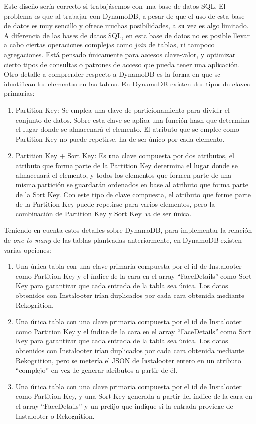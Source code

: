 Este diseño sería correcto si trabajásemos con una base de datos SQL. El problema es que al trabajar con DynamoDB, a pesar de que el uso de esta base de datos es muy sencillo y ofrece muchas posibilidades, a su vez es algo limitado. A diferencia de las bases de datos SQL, en esta base de datos no es posible llevar a cabo ciertas operaciones complejas como \textit{join} de tablas, ni tampoco agregaciones. Está pensado únicamente para accesos clave-valor, y optimizar cierto tipos de consultas o patrones de acceso que pueda tener una aplicación. Otro detalle a comprender respecto a DynamoDB es la forma en que se identifican los elementos en las tablas. En DynamoDB existen dos tipos de claves primarias:
\begin{enumerate}
    \item Partition Key: Se emplea una clave de particionamiento para dividir el conjunto de datos. Sobre esta clave se aplica una función hash que determina el lugar donde se almacenará el elemento. El atributo que se emplee como Partition Key no puede repetirse, ha de ser único por cada elemento.
    \item Partition Key + Sort Key: Es una clave compuesta por dos atributos, el atributo que forma parte de la Partition Key determina el lugar donde se almacenará el elemento, y todos los elementos que formen parte de una misma partición se guardarán ordenados en base al atributo que forma parte de la Sort Key. Con este tipo de clave compuesta, el atributo que forme parte de la Partition Key puede repetirse para varios elementos, pero la combinación de Partition Key y Sort Key ha de ser única.
\end{enumerate}

Teniendo en cuenta estos detalles sobre DynamoDB, para implementar la relación de \textit{one-to-many} de las tablas planteadas anteriormente, en DynamoDB existen varias opciones:
\begin{enumerate}
    \item Una única tabla con una clave primaria compuesta por el id de Instalooter como Partition Key y el índice de la cara en el array ``FaceDetails'' como Sort Key para garantizar que cada entrada de la tabla sea única. Los datos obtenidos con Instalooter irían duplicados por cada cara obtenida mediante Rekognition.
    \item Una única tabla con una clave primaria compuesta por el id de Instalooter como Partition Key y el índice de la cara en el array ``FaceDetails'' como Sort Key para garantizar que cada entrada de la tabla sea única. Los datos obtenidos con Instalooter irían duplicados por cada cara obtenida mediante Rekognition, pero se metería el JSON de Instalooter entero en un atributo ``complejo'' en vez de generar atributos a partir de él.
    \item Una única tabla con una clave primaria compuesta por el id de Instalooter como Partition Key, y una Sort Key generada a partir del índice de la cara en el array ``FaceDetails'' y un prefijo que indique si la entrada proviene de Instalooter o Rekognition.
\end{enumerate}

